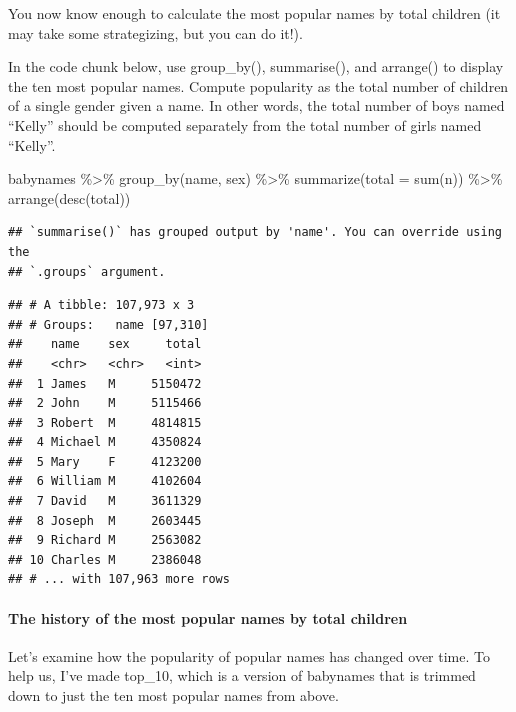 \documentclass[
]{article}
\newenvironment{Shaded}{\begin{snugshade}}{\end{snugshade}}
\newcommand{\AttributeTok}[1]{\textcolor[rgb]{0.77,0.63,0.00}{#1}}
\newcommand{\FunctionTok}[1]{\textcolor[rgb]{0.00,0.00,0.00}{#1}}
\newcommand{\NormalTok}[1]{#1}
\newcommand{\SpecialCharTok}[1]{\textcolor[rgb]{0.00,0.00,0.00}{#1}}
\begin{document}
You now know enough to calculate the most popular names by total
children (it may take some strategizing, but you can do it!).

In the code chunk below, use group\_by(), summarise(), and arrange() to
display the ten most popular names. Compute popularity as the total
number of children of a single gender given a name. In other words, the
total number of boys named ``Kelly'' should be computed separately from
the total number of girls named ``Kelly''.

\begin{Shaded}
\begin{Highlighting}[]
\NormalTok{babynames }\SpecialCharTok{\%\textgreater{}\%}
   \FunctionTok{group\_by}\NormalTok{(name, sex) }\SpecialCharTok{\%\textgreater{}\%}
   \FunctionTok{summarize}\NormalTok{(}\AttributeTok{total =} \FunctionTok{sum}\NormalTok{(n)) }\SpecialCharTok{\%\textgreater{}\%}
   \FunctionTok{arrange}\NormalTok{(}\FunctionTok{desc}\NormalTok{(total))}
\end{Highlighting}
\end{Shaded}

\begin{verbatim}
## `summarise()` has grouped output by 'name'. You can override using the
## `.groups` argument.
\end{verbatim}

\begin{verbatim}
## # A tibble: 107,973 x 3
## # Groups:   name [97,310]
##    name    sex     total
##    <chr>   <chr>   <int>
##  1 James   M     5150472
##  2 John    M     5115466
##  3 Robert  M     4814815
##  4 Michael M     4350824
##  5 Mary    F     4123200
##  6 William M     4102604
##  7 David   M     3611329
##  8 Joseph  M     2603445
##  9 Richard M     2563082
## 10 Charles M     2386048
## # ... with 107,963 more rows
\end{verbatim}

\hypertarget{the-history-of-the-most-popular-names-by-total-children}{%
\paragraph{The history of the most popular names by total
children}\label{the-history-of-the-most-popular-names-by-total-children}}

Let's examine how the popularity of popular names has changed over time.
To help us, I've made top\_10, which is a version of babynames that is
trimmed down to just the ten most popular names from above.
\end{document}
